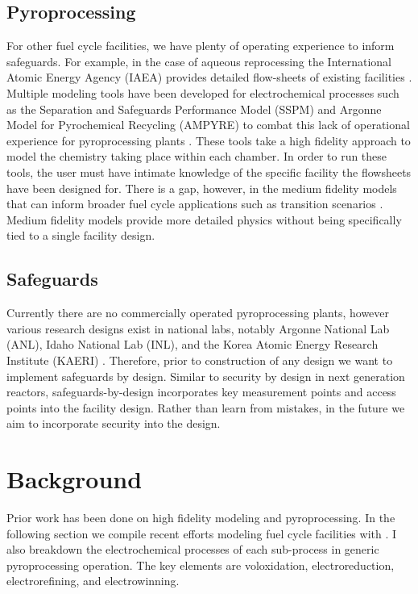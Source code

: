 \subsection{Pyroprocessing}
For other fuel cycle facilities, we have plenty of operating experience to inform safeguards. For example, in the case of aqueous reprocessing
the International Atomic Energy Agency (IAEA) provides detailed flow-sheets of existing facilities \cite{international_atomic_energy_agency_implications_2004}. Multiple modeling
tools have been developed for electrochemical processes such as the Separation and Safeguards Performance Model (SSPM) and Argonne Model for Pyrochemical Recycling (AMPYRE) to combat this lack of operational experience for pyroprocessing plants \cite{maggos_update_2015}. 
These tools take a high fidelity approach to model the
chemistry taking place within each chamber. In order to run these tools, the user must have intimate knowledge of the specific facility the flowsheets have
been designed for. There is a gap, however, in the medium fidelity models that can inform broader fuel cycle applications such as transition scenarios \cite{borrelli_approaches_2017}. 
Medium fidelity models provide more detailed physics without being specifically tied to a single facility design.

\subsection{Safeguards}
Currently there are no commercially operated pyroprocessing plants, however various research designs exist in national labs,
notably Argonne National Lab (ANL), Idaho National Lab (INL), and the Korea Atomic Energy Research Institute (KAERI) \cite{michael_f._simpson_developments_2012, lee_advanced, frigo_conceptual_2003}. 
Therefore, prior to construction of any design we 
want to implement safeguards by design. Similar to security by design in next generation reactors, safeguards-by-design incorporates key measurement 
points and access points into the facility design. Rather than learn from mistakes, in the future we aim to incorporate security 
into the design.

\section{Background}
Prior work has been done on high fidelity modeling and pyroprocessing. In the following section we compile recent efforts modeling fuel cycle facilities with
\Cyclus. I also breakdown the electrochemical processes of each sub-process in generic pyroprocessing operation. The key elements are voloxidation, electroreduction, electrorefining, and electrowinning. 

